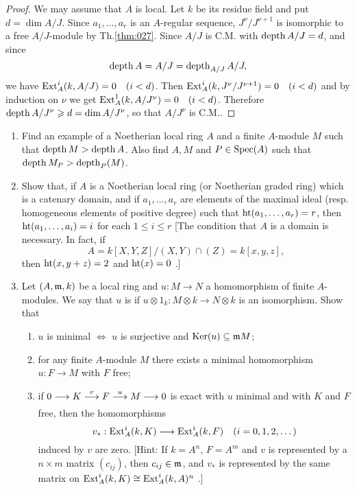 \documentclass[../main]{subfiles}
\begin{document}
\begin{proof}
We may assume that $A$ is local. Let $k$ be its residue field and put $d=\dim A / J$. Since $a_1, \ldots, a_r$ is an $A$-regular sequence, $J^\nu / J^{\nu+1}$ is isomorphic to a free $A / J$-module by Th.\ref{thm:027}. Since $A / J$ is C.M. with $\operatorname{depth} A / J=d$, and since \[\operatorname{depth} A=A/J=\operatorname{depth}_{A/J}A/J,\] we have $\Ext_A^i(k,A/J)=0\for{i<d}$. Then $\Ext_A^i(k, J^\nu/ J^{\nu+1})=0\for{i<d}$ and by induction on $\nu$ we get \newline $\Ext_A^1(k, A/J^\nu)=0\for{i<d}$. Therefore $\operatorname{depth} A / J^\nu \geqslant d=\operatorname{dim} A / J^\nu$, so that $A / J^\nu$ is C.M..
\end{proof}

\begin{exercise}
\begin{enumerate}[label = \arabic*.]
    \item\label{ex:ch06.1} Find an example of a Noetherian local ring $A$ and a finite $A$-module $M$ such that $\operatorname{depth} M>\operatorname{depth} A$. Also find $A, M$ and \newline $P \in \operatorname{Spec}(A)$ such that $\operatorname{depth} M_P>\operatorname{depth}_P(M)$.
    \item\label{ex:ch06.2} Show that, if $A$ is a Noetherian local ring (or Noetherian graded ring) which is a catenary domain, and if $a_1, \ldots,a_r$ are elements of the maximal ideal (resp. homogeneous elements of positive degree) such that $\operatorname{ht}(a_1,\dots,a_r)=r$, then $\operatorname{ht} (a_1, \dots, a_i)=i$ for each $1 \leqslant i \leqslant r$ [The condition that $A$ is a domain is necessary. In fact, if \[A=k[X, Y, Z] /(X,Y) \cap(Z)=k[x, y, z],\] then $\operatorname{ht}(x, y+z)=2$ and $\operatorname{ht}(x)=0$ .]
    \item\label{ex:ch06.3} Let $(A, \mathfrak{m}, k)$ be a local ring and $u: M \longrightarrow N$ a homomorphism of finite $A$-modules. We say that $u$ is  if $u\otimes 1_k: M \otimes k \longrightarrow N \otimes k$ is an isomorphism. Show that
    \begin{enumerate}
        \item $u$ is minimal $\iff$ $u$ is surjective and $\operatorname{Ker}(u) \subseteq \mathfrak{m} M$;
        \item for any finite $A$-module $M$ there exists a minimal homomorphism $u:F\longrightarrow M$ with $F$ free;
        \item if $0 \longrightarrow K \varrightarrow{v} F \varrightarrow{u} M \longrightarrow 0$ is exact with $u$ minimal and with $K$ and $F$ free, then the homomorphisms \[v_*: \Ext_A^i(k, K) \longrightarrow \Ext_A^i(k, F)\for{i=0,1,2, \ldots}\] induced by $v$ are zero. [Hint: If $k=A^n$, $F=A^m$ and $v$ is represented by a $n \times m$ matrix $(c_{i j})$, then $c_{i j} \in \mathfrak{m}$, and $v_*$ is represented by the same matrix on $\operatorname{Ext}_A^i(k, K) \cong \operatorname{Ext}_A^i(k, A)^n$ .]

\end{enumerate}
\end{enumerate}
\end{exercise}
\end{document}
